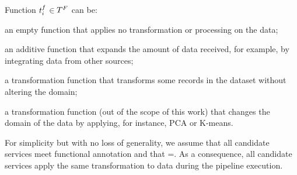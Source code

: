     Function $t^f_{i}$$\in$$T^F_{}$ can be:
    \begin{enumerate*}[label=\textit{\roman*})]
      \item an empty function \tf{\epsilon} that applies no transformation or processing on the data;
      \item an additive function  that expands the amount of data received, for example, by integrating data from other sources;
      \item a transformation function  that transforms some records in the dataset without altering the domain;
      \item a transformation function  (out of the scope of this work) that changes the domain of the data by applying, for instance, PCA or K-means.
    \end{enumerate*}

For simplicity but with no loss of generality, we assume that all candidate services meet functional annotation \F{} and that \TF{}=\tf{}. As a consequence, all candidate services apply the same transformation to data during the pipeline execution.

